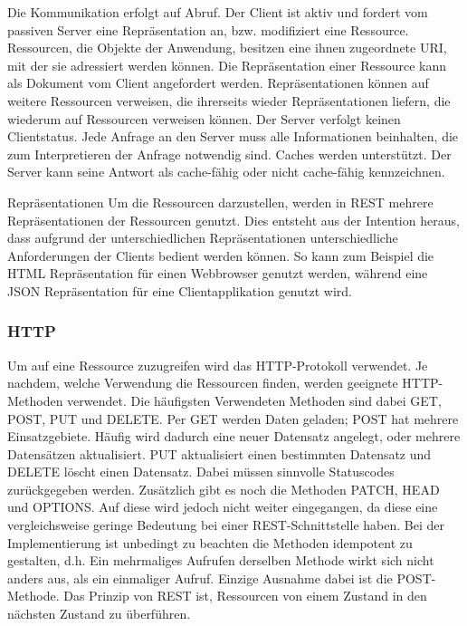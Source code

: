 Die Kommunikation erfolgt auf Abruf. Der Client ist aktiv und fordert vom passiven Server eine Repräsentation an, bzw. modifiziert eine Ressource. Ressourcen, die Objekte der Anwendung, besitzen eine ihnen zugeordnete URI, mit der sie adressiert werden können. Die Repräsentation einer Ressource kann als Dokument vom Client angefordert werden. Repräsentationen können auf weitere Ressourcen verweisen, die ihrerseits wieder Repräsentationen liefern, die wiederum auf Ressourcen verweisen können. Der Server verfolgt keinen Clientstatus. Jede Anfrage an den Server muss alle Informationen beinhalten, die zum Interpretieren der Anfrage notwendig sind. Caches werden unterstützt. Der Server kann seine Antwort als cache-fähig oder nicht cache-fähig kennzeichnen.

Repräsentationen
Um die Ressourcen darzustellen, werden in REST mehrere Repräsentationen der Ressourcen genutzt. Dies entsteht aus der Intention heraus, dass aufgrund der unterschiedlichen Repräsentationen unterschiedliche Anforderungen der Clients bedient werden können. So kann zum Beispiel die HTML Repräsentation für einen Webbrowser genutzt werden, während eine JSON Repräsentation für eine Clientapplikation genutzt wird.

\subsubsection{HTTP}
\label{sec:RESTHTTP}


Um auf eine Ressource zuzugreifen wird das HTTP-Protokoll verwendet. Je nachdem, welche Verwendung die Ressourcen finden, werden geeignete HTTP-Methoden verwendet. Die häufigsten Verwendeten Methoden sind dabei GET, POST, PUT und DELETE. Per GET werden Daten geladen; POST hat mehrere Einsatzgebiete. Häufig wird dadurch eine neuer Datensatz angelegt, oder mehrere Datensätzen aktualisiert. PUT aktualisiert einen bestimmten Datensatz und DELETE löscht einen Datensatz. Dabei müssen sinnvolle Statuscodes zurückgegeben werden. Zusätzlich gibt es noch die Methoden PATCH, HEAD und OPTIONS. Auf diese wird jedoch nicht weiter eingegangen, da diese eine vergleichsweise geringe Bedeutung bei einer REST-Schnittstelle haben. Bei der Implementierung ist unbedingt zu beachten die Methoden idempotent zu gestalten, d.h. Ein mehrmaliges Aufrufen derselben Methode wirkt sich nicht anders aus, als ein einmaliger Aufruf. Einzige Ausnahme dabei ist die POST-Methode. Das Prinzip von REST ist, Ressourcen von einem Zustand in den nächsten Zustand zu überführen.

